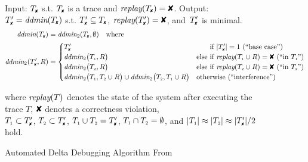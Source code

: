 \begin{figure}[t]
\caption{Automated Delta Debugging Algorithm From~\cite{Zeller:1999:YMP:318773.318946}}
\begin{boxedminipage}{\textwidth}
Input: $\cfail$ s.t. $\cfail$ is a trace and $\test(\cfail) = \DFAIL$. Output: $\dfail
= \ddmin(\cfail)$ s.t. $\dfail \subseteq
\cfail$, $\test(\dfail) = \DFAIL$, and~$\dfail$ is minimal.
\begin{align*}
\ddmin(\cfail) &= \ddmin_2(\cfail, \emptyset) \quad \text{where} \\
\ddmin_2(\dfail, R) &=
\begin{cases}
\dfail & \text{\hphantom{else }if $|\dfail| = 1$ (``base case'')} \\
\ddmin_2\bigl(\done, R\bigr) &
\text{else if $\test(\done \cup R) = \DFAIL$ (``in $\done$'')} \\
\ddmin_2\bigl(\dtwo, R\bigr) &
\text{else if $\test(\dtwo \cup R) = \DFAIL$ (``in $\dtwo$'')} \\
\ddmin_2\bigl(\done, \dtwo \cup R\bigr) \cup \ddmin_2\bigl(\dtwo, \done \cup
R\bigr) & \text{otherwise (``interference'')}
\end{cases}
\end{align*}
\begin{center}
where $\textit{replay}(T)$ denotes the state of the system after executing the trace $T$,
$\DFAIL$ denotes a correctness violation, \\
$\done \subset \dfail$, $\dtwo \subset \dfail$, $\done \cup \dtwo = \dfail$, ${T_{\scriptscriptstyle 1}} \cap
{T_{\scriptscriptstyle 2}} = \emptyset$, and $|\done| \approx |\dtwo| \approx |\dfail| / 2$
hold.
\end{center}
\end{boxedminipage}
\label{fig:ddmin}
\end{figure}

